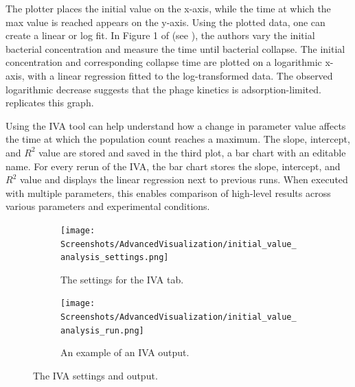 The plotter places the initial value on the x-axis, while the time at which the max value is reached appears on the y-axis. 
Using the plotted data, one can create a linear or log fit.
In Figure 1 of \citet{mullaExtremeDiversityPhage2024} (see ), the authors vary the initial bacterial concentration and measure the time until bacterial collapse. 
The initial concentration and corresponding collapse time are plotted on a logarithmic x-axis, with a linear regression fitted to the log-transformed data.
The observed logarithmic decrease suggests that the phage kinetics is adsorption-limited. 
 replicates this graph. 

Using the IVA tool can help understand how a change in parameter value affects the time at which the population count reaches a maximum.
The slope, intercept, and $R^2$ value are stored and saved in the third plot, a bar chart with an editable name. 
For every rerun of the IVA, the bar chart stores the slope, intercept, and $R^2$ value and displays the linear regression next to previous runs. 
When executed with multiple parameters, this enables comparison of high-level results across various parameters and experimental conditions.

\begin{figure}[h!]
    \centering
    \begin{subfigure}{0.49\linewidth}
        \centering
        \captionsetup{width=1\linewidth}
        \texttt{[image: Screenshots/AdvancedVisualization/initial\_value\_analysis\_settings.png]}
        \caption{
            The settings for the IVA tab. 
        }
        \label{fig:ss:av:initial_value_analysis_settings}
        \vspace*{\fill}
    \end{subfigure}
    \hfill
    \begin{subfigure}{0.49\linewidth}
        \centering
        \captionsetup{width=1\linewidth}
        \texttt{[image: Screenshots/AdvancedVisualization/initial\_value\_analysis\_run.png]}
        \caption{
            An example of an IVA output. 
        }
        \label{fig:ss:av:initial_value_analysis_run}
        \vspace*{\fill}
    \end{subfigure}
    \caption{The IVA settings and output. }
\end{figure}

